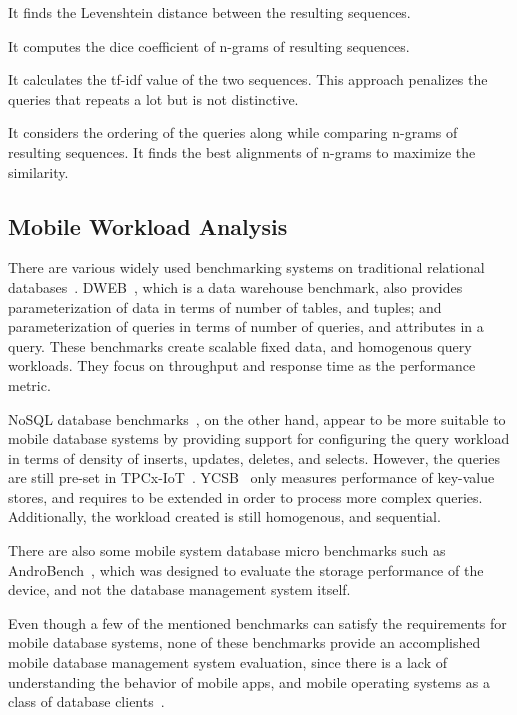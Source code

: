  It finds the Levenshtein distance between the resulting sequences.

 It computes the dice coefficient of n-grams of resulting sequences.

 It calculates the tf-idf value of the two sequences. This approach penalizes the queries that repeats a lot but is not distinctive.

 It considers the ordering of the queries along while comparing n-grams of resulting sequences. It finds the best alignments of n-grams to maximize the similarity.

\subsection{Mobile Workload Analysis}

There are various widely used benchmarking systems on traditional relational databases~\cite{council2008tpch, council2010tpcc, council2017tpcds, osdb2004}. 
DWEB~\cite{darmont2005dweb}, which is a data warehouse benchmark, also provides parameterization of data in terms of number of tables, and tuples; and parameterization of queries in terms of number of queries, and attributes in a query.
These benchmarks create scalable fixed data, and homogenous query workloads.
They focus on throughput and response time as the performance metric.

NoSQL database benchmarks~\cite{cooper2010YCSB, council2017tpcxiot}, on the other hand, appear to be more suitable to mobile database systems by providing support for configuring the query workload in terms of density of inserts, updates, deletes, and selects.
However, the queries are still pre-set in TPCx-IoT~\cite{council2017tpcxiot}. YCSB~\cite{cooper2010YCSB} only measures performance of key-value stores, and requires to be extended in order to process more complex queries.
Additionally, the workload created is still homogenous, and sequential.
 
There are also some mobile system database micro benchmarks such as AndroBench~\cite{liu2014application}, which was designed to evaluate the storage performance of the device, and not the database management system itself.


Even though a few of the mentioned benchmarks can satisfy 
the requirements for mobile database systems, none of these benchmarks provide an accomplished mobile database management system evaluation, since there is a lack of understanding the behavior of mobile apps, and mobile operating systems as a class of database clients~\cite{kennedy2015pocket}.